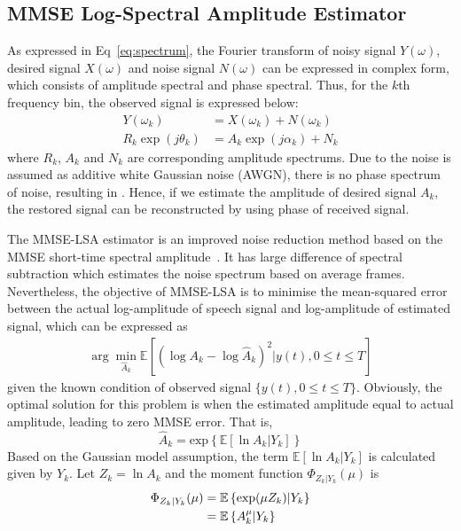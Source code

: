 \subsection{MMSE Log-Spectral Amplitude Estimator}
As expressed in Eq~\ref{eq:spectrum}, the Fourier transform of noisy signal $Y(\omega)$, desired signal $X(\omega)$ and noise signal $N(\omega)$ can be expressed in complex form, which consists of amplitude spectral and phase spectral. Thus, for the $k$th frequency bin, the observed signal is expressed below:
\begin{align}
Y(\omega_k)&=X(\omega_k)+N(\omega_k)\\
R_k\exp(j\theta_k)&=A_k\exp(j\alpha_k)+N_k
\end{align}
where $R_k$, $A_k$ and $N_k$ are corresponding amplitude spectrums. Due to the noise is assumed as additive white Gaussian noise (AWGN), there is no phase spectrum of noise, resulting in . Hence, if we estimate the amplitude of desired signal $A_k$, the restored signal can be reconstructed by using phase of received signal.
\par
The MMSE-LSA estimator is an improved noise reduction method based on the MMSE short-time spectral amplitude~\cite{ephraim1985speech}. It has large difference of spectral subtraction which estimates the noise spectrum based on average frames. Nevertheless, the objective of MMSE-LSA is to minimise the mean-squared error between the actual log-amplitude of speech signal and log-amplitude of estimated signal, which can be expressed as 
\begin{align}
\arg\min_{\hat{A}_k}{\mathbb{E}\left[\left(\log A_k-\log\hat{A}_k\right)^2\vert y(t),0\leq t\leq T\right]}
\end{align} 
given the known condition of observed signal $\{ y(t), 0\leq t\leq T\}$. Obviously, the optimal solution for this problem is when the estimated amplitude equal to actual amplitude, leading to zero MMSE error. That is,
\begin{equation}
\hat A_k=\text{exp}\left\{\mathbb{E}\left[\ln A_k | Y_k\right]\right\}
\end{equation}
Based on the Gaussian model assumption, the term $\mathbb{E}\left[\ln A_k | Y_k\right]$ is calculated given by $Y_k$. Let $Z_k=\ln A_k$ and the moment function $\Phi_{Z_k|Y_k}(\mu)$ is
\begin{align}
	\Phi_{Z_k|Y_k}(\mu)&=\mathbb{E}\left\{\text{exp}(\mu Z_k) | Y_k\right\} \notag\\
	&= \mathbb{E}\left\{A_k^\mu | Y_k\right\} \label{eq:aa}
\end{align}
